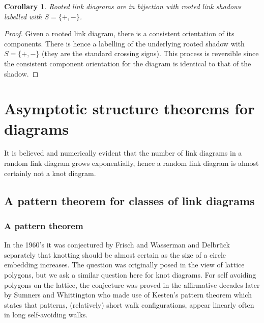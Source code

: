 \documentclass[amsmath,longbibliography,secnumarabic,floatfix,amssymb,nofootinbib,nobibnotes,letterpaper,11pt,tightenlines,notitlepage,showkeys,showlabels]{amsart}%
\newtheorem{corollary}[theorem]{Corollary}
\begin{document}
\begin{corollary}
  Rooted link diagrams are in bijection with rooted link shadows
  labelled with $S = \{+, -\}$.
  \label{cor:linkdiaaresshadows}
\end{corollary}

\begin{proof}
  Given a rooted link diagram, there is a consistent orientation of
  its components. There is hence a labelling of the underlying rooted
  shadow with $S = \{+, -\}$ (they are the standard crossing signs). This
  process is reversible since the consistent component orientation for
  the diagram is identical to that of the shadow.
\end{proof}

\section{Asymptotic structure theorems for diagrams}
\label{sec:structure}

It is believed and numerically evident \cite{PZJasympconj2004} that the number of link diagrams in a
random link diagram grows exponentially, hence a random link diagram is almost certainly not a knot
diagram.

\subsection{A pattern theorem for classes of link diagrams}
\label{sec:patternthm}

\newcommand{\MapClass}{\mathscr{M}}

\subsubsection{A pattern theorem}
\label{sec:weakpatternthm}

In the 1960's it was conjectured by Frisch and
Wasserman\cite{Frisch_1961} and Delbr\"uck\cite{10.1090/psapm/014}
separately that knotting should be almost certain as the size of a
circle embedding increases. The question was originally posed in the
view of lattice polygons, but we ask a similar question here for knot
diagrams. For self avoiding polygons on the lattice, the conjecture
was proved in the affirmative decades later by Sumners and
Whittington\cite{Sumners_1988} who made use of Kesten's pattern
theorem\cite{Kesten_1964,Kesten_1963} which states that patterns,
(relatively) short walk configurations, appear linearly often in long
self-avoiding walks.
\end{document}

